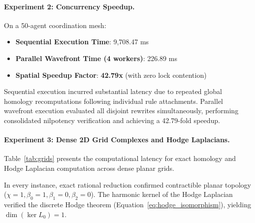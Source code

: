 \documentclass[10pt,a4paper]{article}
\begin{document}
\paragraph{Experiment 2: Concurrency Speedup.}
On a 50-agent coordination mesh:
\begin{itemize}
    \item \textbf{Sequential Execution Time}: 9,708.47 ms
    \item \textbf{Parallel Wavefront Time (4 workers)}: 226.89 ms
    \item \textbf{Spatial Speedup Factor}: \textbf{42.79x} (with zero lock contention)
\end{itemize}
Sequential execution incurred substantial latency due to repeated global homology recomputations following individual rule attachments. Parallel wavefront execution evaluated all disjoint rewrites simultaneously, performing consolidated nilpotency verification and achieving a 42.79-fold speedup.

\paragraph{Experiment 3: Dense 2D Grid Complexes and Hodge Laplacians.}
Table~\ref{tab:grids} presents the computational latency for exact homology and Hodge Laplacian computation across dense planar grids.

\begin{table}[ht]
\centering
\caption{Exact topological invariant computation times on dense planar grid complexes.}
\label{tab:grids}
\vspace{0.4em}
\end{table}

In every instance, exact rational reduction confirmed contractible planar topology ($\chi = 1, \beta_0 = 1, \beta_1 = 0, \beta_2 = 0$). The harmonic kernel of the Hodge Laplacian verified the discrete Hodge theorem (Equation~\ref{eq:hodge_isomorphism}), yielding $\dim(\ker L_0) = 1$.
\end{document}
